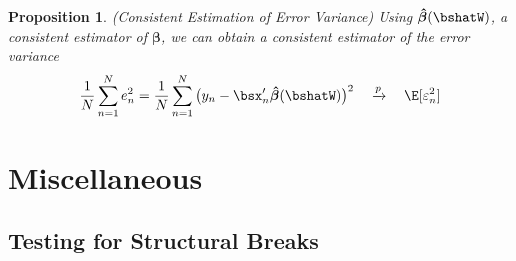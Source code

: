 \documentclass[12pt]{article}
\theoremstyle{plain}
\newtheorem{prop}[thm]{Proposition}
\theoremstyle{definition}
\theoremstyle{remark}
\newcommand{\bsbeta}{\boldsymbol{\beta}}
\newcommand{\bshatbeta}{\boldsymbol{\hat{\beta}}}
\newcommand{\pto}{\xrightarrow{p}}
\newcommand{\sumnN}{\sum^N_{n=1}}
\begin{document}
\begin{prop}\emph{(Consistent Estimation of Error Variance)}
Using $\bshatbeta(\bshatW)$, a consistent estimator of $\bsbeta$, we can
obtain a consistent estimator of the error variance
\begin{align*}
  \frac{1}{N} \sumnN e_n^2
  =
  \frac{1}{N} \sumnN \big(y_n - \bsx_n'\bshatbeta(\bshatW)\big)^2
  \quad\pto\quad
  \E[\varepsilon_n^2]
\end{align*}
\end{prop}


\clearpage
\section{Miscellaneous}

\subsection{Testing for Structural Breaks}
\end{document}
